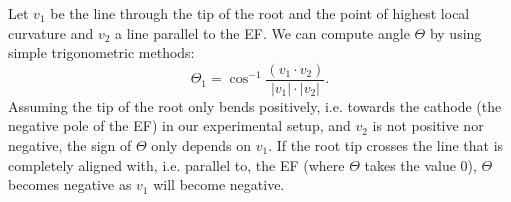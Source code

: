 %
%




Let \( v_{1} \) be the line through the tip of the root and the point of highest local curvature and \(v_{2} \) a line parallel to the EF. 
We can compute angle \( \Theta \)  by using simple trigonometric methods:
\begin{equation} \label{angle1}
\Theta_{1}  = \cos^{-1}\frac{( v_{1} \cdot v_{2}) }{ | v_{1} | \cdot | v_{2} |}.
\end{equation}
Assuming the tip of the root only bends positively, i.e. towards the cathode (the negative pole of the EF) in our experimental setup, and \( v_{2} \) is not positive nor negative, the sign of \(\Theta \) only depends on \( v_{1} \). If the root tip crosses the line that is completely aligned with, i.e. parallel to, the EF (where \( \Theta \) takes the value 0), \( \Theta \) becomes negative as \( v_{1} \) will become negative. 

